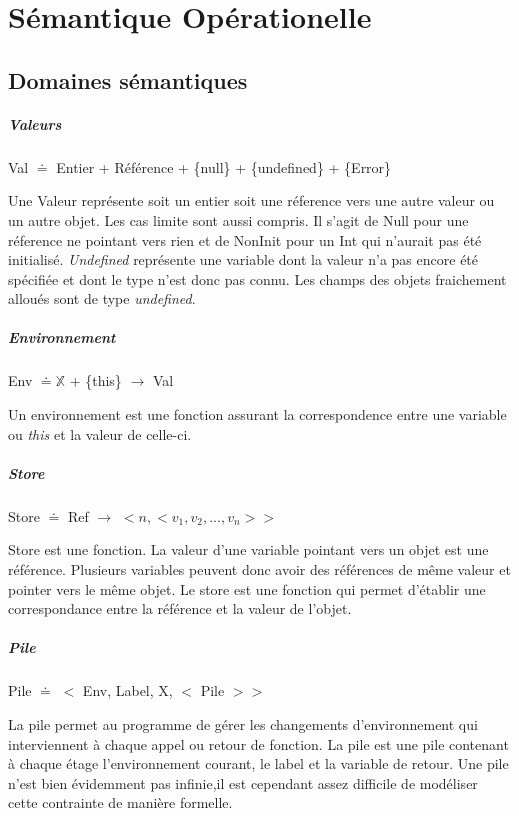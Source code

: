 \chapter{Sémantique Opérationelle}


\section{Domaines sémantiques}
\paragraph{Valeurs} Val $\doteq$ Entier + Référence + \{null\} + \{undefined\} + \{Error\}

Une Valeur représente soit un entier soit une réference vers une autre valeur
ou un autre objet. Les cas limite sont aussi compris. Il s'agit de Null pour 
une réference ne pointant vers rien  et de NonInit pour un Int qui n'aurait 
pas été initialisé. \emph{Undefined} représente une variable dont la valeur n'a
pas encore été spécifiée et dont le type n'est donc pas connu. Les champs
des objets fraichement alloués sont de type \emph{undefined}.

\paragraph{Environnement} Env $\doteq \mathbb{X}$ + \{this\} $\rightarrow$ Val

Un environnement est une fonction assurant la correspondence entre une variable ou \emph{this} et la valeur de celle-ci.

\paragraph{Store} Store $\doteq$ Ref $\rightarrow$ $<n,<v_1,v_2,...,v_n> >$	%

Store est une fonction. La valeur d'une variable pointant vers un objet est une référence. Plusieurs 
variables peuvent donc avoir des références de même valeur et pointer vers le 
même objet. Le store est une fonction qui permet d'établir une correspondance 
entre la référence et la valeur de l'objet.

\paragraph{Pile} Pile $\doteq$ $<$ Env, Label, X, $<$ Pile $> >$ 

La pile permet au programme de gérer les changements d'environnement qui interviennent
à chaque appel ou retour de fonction. La pile est une pile contenant à chaque étage 
l'environnement courant, le label et la variable de retour. Une pile n'est bien évidemment pas infinie,il est cependant assez difficile de modéliser cette contrainte de manière formelle.


